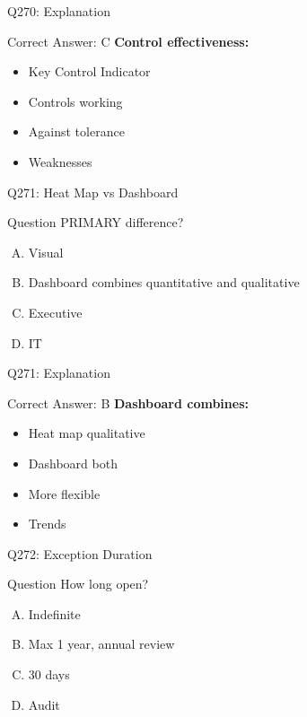 \documentclass{beamer}
\begin{document}
	\begin{frame}{Q270: Explanation}
		\begin{block}{Correct Answer: C}
			\textbf{Control effectiveness:}
			\begin{itemize}
				\item Key Control Indicator
				\item Controls working
				\item Against tolerance
				\item Weaknesses
			\end{itemize}
		\end{block}
	\end{frame}
	
	\begin{frame}{Q271: Heat Map vs Dashboard}
		\begin{block}{Question}
			PRIMARY difference?
		\end{block}
		\begin{enumerate}[(A)]
			\item Visual
			\item Dashboard combines quantitative and qualitative
			\item Executive
			\item IT
		\end{enumerate}
	\end{frame}
	
	\begin{frame}{Q271: Explanation}
		\begin{block}{Correct Answer: B}
			\textbf{Dashboard combines:}
			\begin{itemize}
				\item Heat map qualitative
				\item Dashboard both
				\item More flexible
				\item Trends
			\end{itemize}
		\end{block}
	\end{frame}
	
	\begin{frame}{Q272: Exception Duration}
		\begin{block}{Question}
			How long open?
		\end{block}
		\begin{enumerate}[(A)]
			\item Indefinite
			\item Max 1 year, annual review
			\item 30 days
			\item Audit
		\end{enumerate}
	\end{frame}
	
\end{document}
